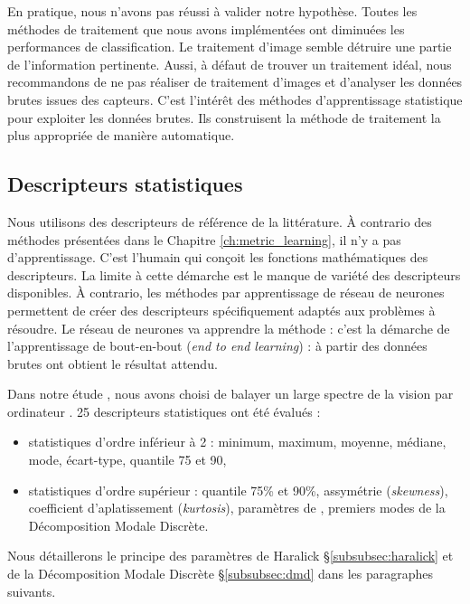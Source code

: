 En pratique, nous n'avons pas réussi à valider notre hypothèse.
Toutes les méthodes de traitement que nous avons implémentées ont diminuées les performances de classification.
Le traitement d'image semble détruire une partie de l'information pertinente.
Aussi, à défaut de trouver un traitement idéal, nous recommandons de ne pas réaliser de traitement d'images et d'analyser les données brutes issues des capteurs.
C'est l'intérêt des méthodes d'apprentissage statistique pour exploiter les données brutes.
Ils construisent la méthode de traitement la plus appropriée de manière automatique.

\subsection{Descripteurs statistiques} \label{subsec:statistical_descriptor}
Nous utilisons des descripteurs de référence de la littérature.
À contrario des méthodes présentées dans le Chapitre \ref{ch:metric_learning}, il n'y a pas d'apprentissage.
C'est l'humain qui conçoit les fonctions mathématiques des descripteurs.
La limite à cette démarche est le manque de variété des descripteurs disponibles.
À contrario, les méthodes par apprentissage de réseau de neurones permettent de créer des descripteurs spécifiquement adaptés aux problèmes à résoudre.
Le réseau de neurones va apprendre la méthode : c'est la démarche de l'apprentissage de bout-en-bout (\textit{end to end learning}) : à partir des données brutes ont obtient le résultat attendu.

Dans notre étude , nous avons choisi de balayer un large spectre de la vision par ordinateur \cite{nagorny_quality_2017}.
25 descripteurs statistiques ont été évalués :
\begin{itemize}
	\item statistiques d'ordre inférieur à 2 :
		\subitem minimum,
		\subitem maximum,
		\subitem moyenne,
		\subitem médiane,
		\subitem mode,
		\subitem écart-type,
		\subitem quantile 75 et 90,
	\item statistiques d'ordre supérieur :
		\subitem quantile 75\% et 90\%,
		\subitem assymétrie (\textit{skewness}),
		\subitem coefficient d’aplatissement (\textit{kurtosis}),
		 paramètres de \citeauthor{haralick_textural_1973},
		 premiers modes de la Décomposition Modale Discrète.
\end{itemize}

Nous détaillerons le principe des paramètres de Haralick §\ref{subsubsec:haralick} et de la Décomposition Modale Discrète §\ref{subsubsec:dmd} dans les paragraphes suivants.

